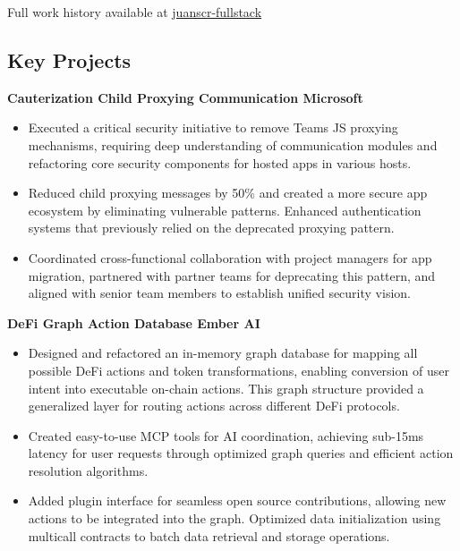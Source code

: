 \documentclass[11pt,a4paper]{article}
\newcommand{\projectentry}[2]{
    {\large\bfseries #1 \hfill #2} \\ \vspace{-0.5cm}
}
\begin{document}
\begin{flushright}
%
    \small Full work history available at
    \href{https://www.linkedin.com/in/juanscr-fullstack}{\faLinkedin juanscr-fullstack}
    \end{flushright}

\vfill
\subsection*{Key Projects}

\projectentry{Cauterization Child Proxying Communication}{Microsoft}

\begin{itemize}
    \item Executed a critical security initiative to remove Teams JS proxying
    mechanisms, requiring deep understanding of communication modules and
    refactoring core security components for hosted apps in various hosts.

    \item Reduced child proxying messages by 50\% and created a more secure app
    ecosystem by eliminating vulnerable patterns. Enhanced authentication
    systems that previously relied on the deprecated proxying pattern.

    \item Coordinated cross-functional collaboration with project managers for
    app migration, partnered with partner teams for deprecating this pattern,
    and aligned with senior team members to establish unified security vision.
\end{itemize}

\projectentry{DeFi Graph Action Database}{Ember AI}

\begin{itemize}
    \item Designed and refactored an in-memory graph database for mapping all
    possible DeFi actions and token transformations, enabling conversion of user
    intent into executable on-chain actions. This graph structure provided a
    generalized layer for routing actions across different DeFi protocols.

    \item Created easy-to-use MCP tools for AI coordination, achieving sub-15ms
    latency for user requests through optimized graph queries and efficient
    action resolution algorithms.

    \item Added plugin interface for seamless open source contributions,
    allowing new actions to be integrated into the graph. Optimized data
    initialization using multicall contracts to batch data retrieval and storage
    operations.
\end{itemize}
\end{document}
